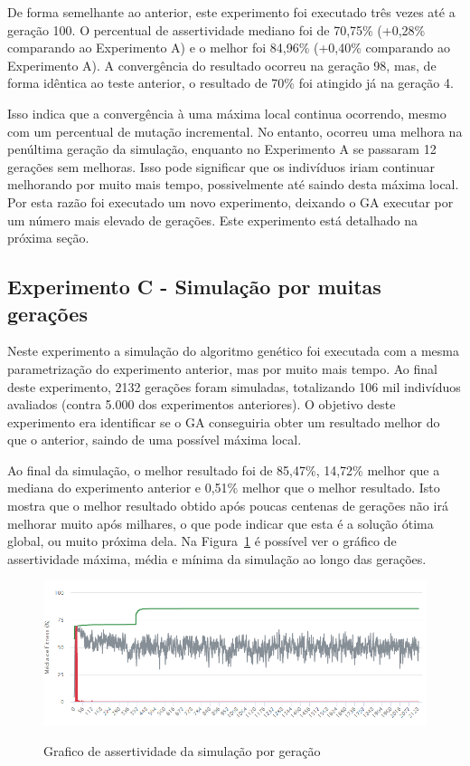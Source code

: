 \documentclass[12pt,oneside,a4paper,english,french,spanish,brazil,]{abntex2}
\begin{document}
De forma semelhante ao anterior, este experimento foi executado três vezes até a geração 100. O percentual de assertividade mediano foi de 70,75\% (+0,28\% comparando ao Experimento A) e o melhor foi 84,96\% (+0,40\% comparando ao Experimento A). A convergência do resultado ocorreu na geração 98, mas, de forma idêntica ao teste anterior, o resultado de 70\% foi atingido já na geração 4. 

Isso indica que a convergência à uma máxima local continua ocorrendo, mesmo com um percentual de mutação incremental. No entanto, ocorreu uma melhora na penúltima geração da simulação, enquanto no Experimento A se passaram 12 gerações sem melhoras. Isso pode significar que os indivíduos iriam continuar melhorando por muito mais tempo, possivelmente até saindo desta máxima local. Por esta razão foi executado um novo experimento, deixando o GA executar por um número mais elevado de gerações. Este experimento está detalhado na próxima seção.


\subsection{Experimento C - Simulação por muitas gerações}

Neste experimento a simulação do algoritmo genético foi executada com a mesma parametrização do experimento anterior, mas por muito mais tempo. Ao final deste experimento, 2132 gerações foram simuladas, totalizando 106 mil indivíduos avaliados (contra 5.000 dos experimentos anteriores). O objetivo deste experimento era identificar se o GA conseguiria obter um resultado melhor do que o anterior, saindo de uma possível máxima local.

Ao final da simulação, o melhor resultado foi de 85,47\%, 14,72\% melhor que a mediana do experimento anterior e 0,51\% melhor que o melhor resultado. Isto mostra que o melhor resultado obtido após poucas centenas de gerações não irá melhorar muito após milhares, o que pode indicar que esta é a solução ótima global, ou muito próxima dela. Na Figura~\ref{fig:DES_Grafico_Experimento_C} é possível ver o gráfico de assertividade máxima, média e mínima da simulação ao longo das gerações.


\begin{figure}[ht]
\centering
\caption{Grafico de assertividade da simulação por geração}
\includegraphics[width=1.0\textwidth]{imagens/DES_Grafico_Experimento_C.PNG}
\sourceAuthor{}
\label{fig:DES_Grafico_Experimento_C}
\end{figure}
\end{document}
